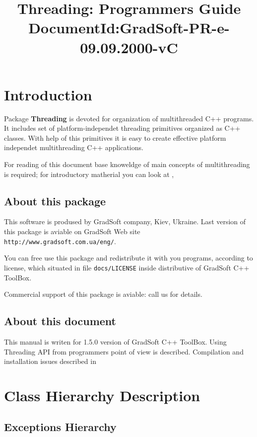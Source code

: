 \documentclass[10pt]{article}
\title{ Threading: Programmers Guide  
       \newline
       \small{DocumentId:GradSoft-PR-e-09.09.2000-vC}
      }
\begin{document}
\maketitle{}

\tableofcontents

\section{ Introduction }

 Package {\bf Threading } is devoted for organization of multithreaded C++ 
 programs. It includes set of platform-independet threading primitives
 organized as C++ classes. With help of this primitives it is easy
 to create effective platform independet multithreading C++ applications.

 For reading of this document base knoweldge of main concepts of
multithreading is required; for introductory matherial you can look
at 
 \cite{MPT}, \cite{CPT-FAQ}

\subsection{ About this package }

 This software is prodused by GradSoft company, Kiev, Ukraine.
Last version of this package is aviable on GradSoft Web site
\verb|http://www.gradsoft.com.ua/eng/|.

 You can free use this package and redistribute it with you programs,
according to license, which situated in file \verb|docs/LICENSE| inside
distributive of GradSoft C++ ToolBox.

 Commercial support of this package is aviable: call us for details.

\subsection{ About this document }

 This manual is writen for 1.5.0 version of GradSoft C++ ToolBox.
 Using Threading API from programmers point of view is described.
 Compilation and installation issues described in \cite{AD}

\section{ Class Hierarchy Description }

\subsection{ Exceptions Hierarchy }
\end{document}
